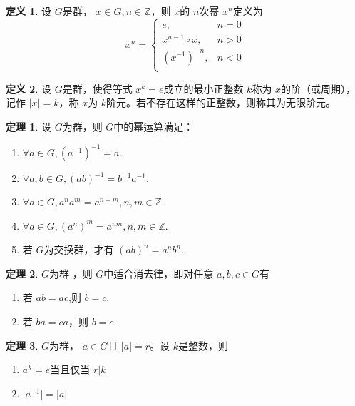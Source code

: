 \documentclass[a4paper,11pt]{article}%
\theoremstyle{remark}
\theoremstyle{remark}
\theoremstyle{definition}
\newtheorem{theorem}{定理}[section]
\theoremstyle{definition}
\newtheorem*{definition}{定义}
\theoremstyle{plain}
\newcommand*{\abs}[1]{\lvert #1 \rvert}
\begin{document}
\begin{definition}
    设 $G$是群， $x\in G,n\in \mathbb{Z}$，则 $x$的 $n$次幂 $x^n$定义为
    \[ x^n=
    \begin{cases}
        e,&n=0\\
        x^{n-1}\circ x,& n>0\\
        (x^{-1})^{-n},&n<0\\
    \end{cases}\]
\end{definition}
\begin{definition}
    设 $G$是群，使得等式 $x^k=e$成立的最小正整数 $k$称为 $x$的阶（或周期），记作 $\abs{x}=k$，称 $x$为 $k$阶元。若不存在这样的正整数，则称其为无限阶元。
\end{definition}
\begin{theorem}
   设 $G$为群，则 $G$中的幂运算满足：
   \begin{enumerate}
    \item  $\forall a\in G,(a^{-1})^{-1}=a.$
    \item  $\forall a,b\in G, (ab)^{-1}=b^{-1}a^{-1}.$
    \item  $\forall a\in G,a^na^m=a^{n+m},n,m\in \mathbb{Z}$.
    \item  $\forall a\in G, (a^n)^m=a^{nm},n,m\in \mathbb{Z}$.
    \item  若 $G$为交换群，才有 $(ab)^n=a^nb^n$.
   \end{enumerate} 
\end{theorem}
\begin{theorem}
   $G$为群 ，则 $G$中适合消去律，即对任意 $a,b,c\in G$有
   \begin{enumerate}
    \item  若 $ab=ac$,则 $b=c.$
    \item 若 $ba=ca$，则 $b=c.$
   \end{enumerate} 
\end{theorem}
\begin{theorem}
    $G$为群，  $a\in G$且 $\abs{a}=r$。设 $k$是整数，则
    \begin{enumerate}
        \item  $a^k=e$当且仅当 $r|k$
        \item  $\abs{a^{-1}}=\abs{a}$
    \end{enumerate}
\end{theorem}
\end{document}
